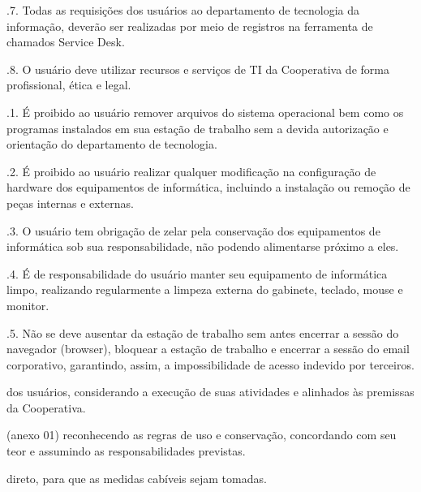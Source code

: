 \documentclass[a4paper,10pt,portuges]{sphinxmanual}
\begin{document}
.7. Todas as requisições dos usuários ao departamento de tecnologia da informação,
deverão ser realizadas por meio de registros na ferramenta de chamados Service Desk.

.8. O usuário deve utilizar recursos e serviços de TI da Cooperativa de forma
profissional, ética e legal.

\sphinxAtStartPar
{}

.1. É proibido ao usuário remover arquivos do sistema operacional bem como os programas
instalados em sua estação de trabalho sem a devida autorização e orientação do departamento de tecnologia.

.2. É proibido ao usuário realizar qualquer modificação na configuração de hardware dos equipamentos
de informática, incluindo a instalação ou remoção de peças internas e externas.

.3. O usuário tem obrigação de zelar pela conservação dos equipamentos de informática sob sua responsabilidade,
não podendo alimentar\sphinxhyphen{}se próximo a eles.

.4. É de responsabilidade do usuário manter seu equipamento de informática limpo, realizando regularmente a
limpeza externa do gabinete, teclado, mouse e monitor.

.5. Não se deve ausentar da estação de trabalho sem antes encerrar a sessão do navegador (browser), bloquear a
estação de trabalho e encerrar a sessão do e\sphinxhyphen{}mail corporativo, garantindo, assim, a impossibilidade de acesso indevido por terceiros.
\begin{description}
\sphinxAtStartPar
dos usuários, considerando a execução de suas atividades e alinhados às premissas da Cooperativa.

\sphinxAtStartPar
(anexo 01) reconhecendo as regras de uso e conservação, concordando com seu teor e assumindo as responsabilidades
previstas.

\sphinxAtStartPar
direto, para que as medidas cabíveis sejam tomadas.

\end{description}
\end{document}
